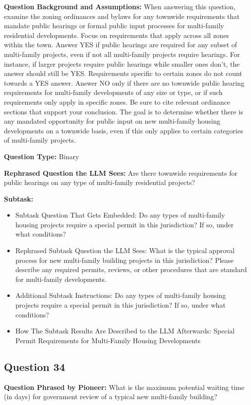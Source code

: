 \noindent\textbf{Question Background and Assumptions:} When answering this question, examine the zoning ordinances and bylaws for any townwide requirements that mandate public hearings or formal public input processes for multi-family residential developments. Focus on requirements that apply across all zones within the town. Answer YES if public hearings are required for any subset of multi-family projects, even if not all multi-family projects require hearings. For instance, if larger projects require public hearings while smaller ones don't, the answer should still be YES. Requirements specific to certain zones do not count towards a YES answer. Answer NO only if there are no townwide public hearing requirements for multi-family developments of any size or type, or if such requirements only apply in specific zones. Be sure to cite relevant ordinance sections that support your conclusion. The goal is to determine whether there is any mandated opportunity for public input on new multi-family housing developments on a townwide basis, even if this only applies to certain categories of multi-family projects.

\noindent\textbf{Question Type:} Binary

\noindent\textbf{Rephrased Question the LLM Sees:} Are there townwide requirements for public hearings on any type of multi-family residential projects?

\noindent\textbf{Subtask:}
\begin{itemize}
\item Subtask Question That Gets Embedded: Do any types of multi-family housing projects require a special permit in this jurisdiction? If so, under what conditions?
\item Rephrased Subtask Question the LLM Sees: What is the typical approval process for new multi-family building projects in this jurisdiction? Please describe any required permits, reviews, or other procedures that are standard for multi-family developments.
\item Additional Subtask Instructions: Do any types of multi-family housing projects require a special permit in this jurisdiction? If so, under what conditions?
\item How The Subtask Results Are Described to the LLM Afterwards: Special Permit Requirements for Multi-Family Housing Developments
\end{itemize}

\vspace{1cm}
\subsection*{Question 34}
\noindent\textbf{Question Phrased by Pioneer:} What is the maximum potential waiting time (in days) for government review of a typical new multi-family building?

